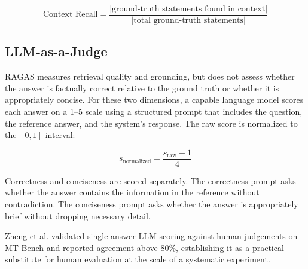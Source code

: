 \begin{equation}
    \text{Context Recall} = 
    \frac{|\text{ground-truth statements found in context}|}
         {|\text{total ground-truth statements}|}
\end{equation}

\subsection{LLM-as-a-Judge}

RAGAS measures retrieval quality and grounding, but does not assess 
whether the answer is factually correct relative to the ground truth 
or whether it is appropriately concise. For these two dimensions, a 
capable language model scores each answer on a 1--5 scale using a 
structured prompt that includes the question, the reference answer, 
and the system's response. The raw score is normalized to the 
$[0, 1]$ interval:

\begin{equation}
    s_{\text{normalized}} = \frac{s_{\text{raw}} - 1}{4}
\end{equation}

Correctness and conciseness are scored separately. The correctness 
prompt asks whether the answer contains the information in the 
reference without contradiction. The conciseness prompt asks whether 
the answer is appropriately brief without dropping necessary detail.

Zheng et al. \cite{zheng2023judging} validated single-answer LLM 
scoring against human judgements on MT-Bench and reported agreement 
above 80\%, establishing it as a practical substitute for human 
evaluation at the scale of a systematic experiment.

